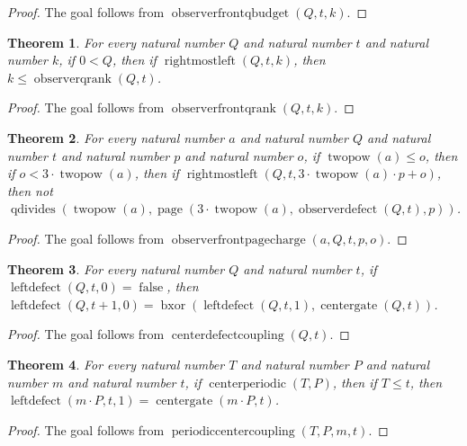 \documentclass[11pt]{article}
\newtheorem{theorem}{Theorem}[section]
\theoremstyle{definition}
\begin{document}
\begin{proof}
The goal follows from \(\operatorname{observerfrontqbudget}(Q, t, k)\).
\end{proof}
\begin{theorem}
\label{ll:observations:observer-front-q-rank}
For every natural number \(Q\) and natural number \(t\) and natural number \(k\), if \(0 < Q\), then if \(\operatorname{rightmostleft}(Q, t, k)\), then \(k \le \operatorname{observerqrank}(Q, t)\).
\end{theorem}
\begin{proof}
The goal follows from \(\operatorname{observerfrontqrank}(Q, t, k)\).
\end{proof}
\begin{theorem}
\label{ll:observations:observer-front-page-charge}
For every natural number \(a\) and natural number \(Q\) and natural number \(t\) and natural number \(p\) and natural number \(o\), if \(\operatorname{twopow}(a) \le o\), then if \(o < 3 \cdot \operatorname{twopow}(a)\), then if \(\operatorname{rightmostleft}(Q, t, 3 \cdot \operatorname{twopow}(a) \cdot p + o)\), then not \(\operatorname{qdivides}(\operatorname{twopow}(a), \operatorname{page}(3 \cdot \operatorname{twopow}(a), \operatorname{observerdefect}(Q, t), p))\).
\end{theorem}
\begin{proof}
The goal follows from \(\operatorname{observerfrontpagecharge}(a, Q, t, p, o)\).
\end{proof}
\begin{theorem}
\label{ll:observations:center-defect-coupling}
For every natural number \(Q\) and natural number \(t\), if \(\operatorname{leftdefect}(Q, t, 0) = \operatorname{false}\), then \(\operatorname{leftdefect}(Q, t + 1, 0) = \operatorname{bxor}(\operatorname{leftdefect}(Q, t, 1), \operatorname{centergate}(Q, t))\).
\end{theorem}
\begin{proof}
The goal follows from \(\operatorname{centerdefectcoupling}(Q, t)\).
\end{proof}
\begin{theorem}
\label{ll:observations:periodic-center-coupling}
For every natural number \(T\) and natural number \(P\) and natural number \(m\) and natural number \(t\), if \(\operatorname{centerperiodic}(T, P)\), then if \(T \le t\), then \(\operatorname{leftdefect}(m \cdot P, t, 1) = \operatorname{centergate}(m \cdot P, t)\).
\end{theorem}
\begin{proof}
The goal follows from \(\operatorname{periodiccentercoupling}(T, P, m, t)\).
\end{proof}
\end{document}
